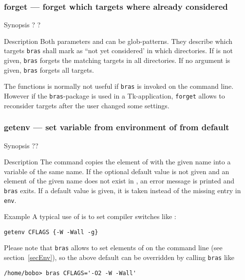 \documentclass[11pt]{scrartcl}
\newcommand{\bras}{\texttt{bras}}
\begin{document}
\subsubsection{forget --- forget which targets where already considered}
\label{proc:forget}
\begin{Describe}
\item[Synopsis]  ? ?
\item[Description] Both parameters  and  can be
  glob-patterns. They describe which targets \bras{} shall mark as ``not
  yet considered' in which directories. If  is not given,
  \bras{} forgets the matching targets in all directories. If no
  argument is given, \bras{} forgets all targets.
  
  The functions is normally not useful if \bras{} is invoked on the
  command line. However if the \bras-package is used in a
  Tk-application, \texttt{forget} allows to reconsider targets after
  the user changed some settings.
\end{Describe}
\subsubsection{getenv --- set variable from environment of from default}
\begin{Describe}
\item[Synopsis]   ??
\item[Description] The command copies the element of  with
  the given name into a variable of the same name. If the optional
  default value is not given and an element of the given name does not
  exist in , an error message is printed and \bras{} exits. If
  a default value is given, it is taken instead of the missing entry
  in \texttt{env}. 
\item[Example] A typical use of  is to set compiler
  switches like :
\begin{verbatim}
getenv CFLAGS {-W -Wall -g}
\end{verbatim}

Please note that \bras{} allows to set elements of  on the
command line (see section~\ref{secEnv}), so the above default can be
overridden by calling \bras{} like
\begin{verbatim}
/home/bobo> bras CFLAGS='-O2 -W -Wall'
\end{verbatim}
\end{Describe}
\end{document}
